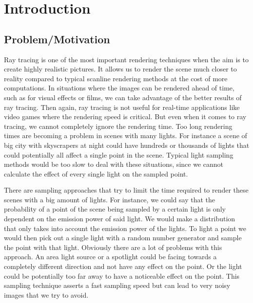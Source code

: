 
\chapter{Introduction}
\label{ch:Introduction}

\section{Problem/Motivation}
\label{sec:Introduction:Motivation}

Ray tracing is one of the most important rendering techniques when the aim is to create highly realistic pictures. It allows us to render the scene much closer to reality compared to typical scanline rendering methods at the cost of more computations. In situations where the images can be rendered ahead of time, such as for visual effects or films, we can take advantage of the better results of ray tracing. Then again, ray tracing is not useful for real-time applications like video games where the rendering speed is critical. But even when it comes to ray tracing, we cannot completely ignore the rendering time. Too long rendering times are becoming a problem in scenes with many lights. For instance a scene of big city with skyscrapers at night could have hundreds or thousands of lights that could potentially all affect a single point in the scene. Typical light sampling methods would be too slow to deal with these situations, since we cannot calculate the effect of every single light on the sampled point.

There are sampling approaches that try to limit the time required to render these scenes with a big amount of lights. For instance, we could say that the probability of a point of the scene being sampled by a certain light is only dependent on the emission power of said light. We would make a distribution that only takes into account the emission power of the lights. To light a point we would then pick out a single light with a random number generator and sample the point with that light. Obviously there are a lot of problems with this approach. An area light source or a spotlight could be facing towards a completely different direction and not have any effect on the point. Or the light could be potentially too far away to have a noticeable effect on the point. This sampling technique asserts a fast sampling speed but can lead to very noisy images that we try to avoid.

